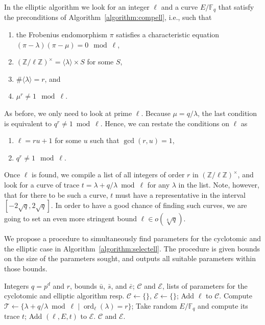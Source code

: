 \documentclass[12pt]{article}
\theoremstyle{plain}
\theoremstyle{definition}
\DeclareMathOperator{\order}{ord} %
\def\Z{\ensuremath{\mathbb{Z}}}
\def\F{\ensuremath{\mathbb{F}}}
\newcounter{algorithm}
\begin{document}
In the elliptic algorithm we look for an integer $\ell$ and a curve
$E/\F_q$ that satisfy the preconditions of
Algorithm~\ref{algorithm:compell}, i.e., such that 
\begin{enumerate}
\item the Frobenius endomorphism $\pi$ satisfies a characteristic
  equation $(\pi-\lambda)(\pi-\mu) = 0 \mod \ell$,
\item $(\Z/\ell\Z)^\times = \langle\lambda\rangle\times S$ for some $S$,
\item $\#\langle\lambda\rangle=r$, and
\item $\mu^r\ne1\mod\ell$.
\end{enumerate}

As before, we only need to look at prime $\ell$. Because
$\mu=q/\lambda$, the last condition is equivalent to
$q^r\ne1\bmod\ell$. Hence, we can restate the conditions on $\ell$ as
\begin{enumerate}
\item $\ell = ru+1$ for some $u$ such that $\gcd(r,u)=1$,
\item $q^r\ne1\mod\ell$.
\end{enumerate}
Once $\ell$ is found, we compile a list of all integers of order $r$
in $(\Z/\ell\Z)^\times$, and look for a curve of trace
$t=\lambda+q/\lambda\bmod\ell$ for any $\lambda$ in the list. Note,
however, that for there to be such a curve, $t$ must have a
representative in the interval $[-2\sqrt{q},2\sqrt{q}]$. In order to
have a good chance of finding such curves, we are going to set an even
more stringent bound $\ell\in o(\sqrt[4]{q})$.

We propose a procedure to simultaneously find parameters for the
cyclotomic and the elliptic case in
Algorithm~\ref{algorithm:selectell}. The procedure is given bounds on
the size of the parameters sought, and outputs all suitable parameters
within those bounds.

\begin{algorithm}
    \label{algorithm:selectell}
    \begin{algorithmic}[1]
      \REQUIRE Integers $q=p^d$ and $r$, bounds $\bar{u}$, $\bar{s}$, and $\bar{e}$;
      \ENSURE $\mathcal{C}$ and $\mathcal{E}$, lists of parameters for the cyclotomic and elliptic algorithm resp.
      \STATE $\mathcal{C}\leftarrow\{\}$, $\mathcal{E}\leftarrow\{\}$;
      \IF{\label{alg:selectell:order}$\order_\ell(q)=rs$ with $s\le\bar{s}$, and $\gcd(rs,u/s)=1$, and $\gcd(ur,d)=1$}
      \STATE Add $\ell$ to $\mathcal{C}$.
      \ENDIF
      \STATE Compute $\mathcal{T} \leftarrow \{\lambda + q/\lambda \bmod\ell \;|\; \order_\ell(\lambda)=r\}$;
      \REPEAT\label{alg:selectell:ellloop}
      \STATE\label{alg:selectell:ellcount} Take random $E/\F_q$ and compute its trace $t$;
      \STATE Add $(\ell,E,t)$ to $\mathcal{E}$.
      \ENDIF
      \ENDIF
      \ENDFOR
      \RETURN $\mathcal{C}$ and $\mathcal{E}$.
    \end{algorithmic}
\end{algorithm}
\end{document}
